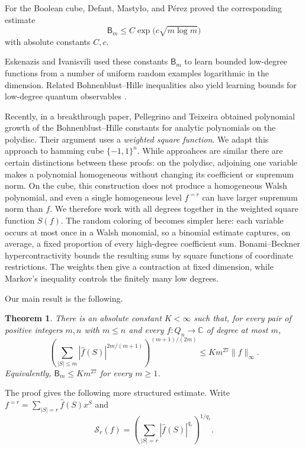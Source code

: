 \documentclass[11pt]{amsart}
\newtheorem{theorem}{Theorem}[section]
\theoremstyle{remark}
\numberwithin{equation}{section}
\newcommand{\BH}{\mathsf B}
\begin{document}
For the Boolean cube, Defant, Masty\l o, and P\'erez \cite{DMP19} proved
the corresponding estimate
\begin{equation}\label{eq:DMP-bound}
\BH_m\le C\exp\!\bigl(c\sqrt{m\log m}\bigr)
\end{equation}
with absolute constants $C,c$.

Eskenazis and Ivanisvili \cite{EI22} used these constants $\BH_m$ to learn bounded
low-degree functions from a number of uniform random examples logarithmic
in the dimension.
Related Bohnenblust--Hille inequalities also yield learning bounds for
low-degree quantum observables \cite{VZ24}.

Recently, in a breakthrough paper, Pellegrino and Teixeira \cite{PT26}
obtained polynomial growth of the Bohnenblust--Hille constants for analytic
polynomials on the polydisc. Their argument uses a \emph{weighted square
function}. We adapt this approach to hamming cube $\{-1,1\}^{n}$. While approahces are similar there are certain distinctions between these proofs: on the polydisc, adjoining one variable makes a polynomial homogeneous
without changing its coefficient or supremum norm. On the cube, this
construction does not produce a homogeneous Walsh polynomial, and even a
single homogeneous level $f^{=r}$ can have larger supremum norm than $f$.
We therefore work with all degrees together in the weighted square
function $S(f)$. The random coloring of \cite{PT26} becomes simpler here:
each variable occurs at most once in a Walsh monomial, so a binomial
estimate captures, on average, a fixed proportion of every high-degree
coefficient sum. Bonami--Beckner hypercontractivity bounds the resulting
sums by square functions of coordinate restrictions. The weights then
give a contraction at fixed dimension, while Markov's inequality controls
the finitely many low degrees.

Our main result is the following.

\begin{theorem}\label{thm:main}
There is an absolute constant $K<\infty$ such that, for every pair of
positive integers $m,n$ with $m\le n$ and every $f:Q_n\to\mathbb C$ of degree
at most $m$,
\begin{equation}\label{eq:main}
\left(\sum_{|S|\le m}|\widehat f(S)|^{2m/(m+1)}\right)^{(m+1)/(2m)}
\le Km^{27}\|f\|_\infty.
\end{equation}
Equivalently, $\BH_m\le Km^{27}$ for every $m\ge1$.
\end{theorem}

The proof gives the following more structured estimate. Write
$f^{=r}=\sum_{|S|=r}\widehat f(S)x^S$ and
\[
\mathcal{S}_{r}(f)=\left(\sum_{|S|=r}|\widehat f(S)|^{q_r}\right)^{1/q_r}.
\]
\end{document}
